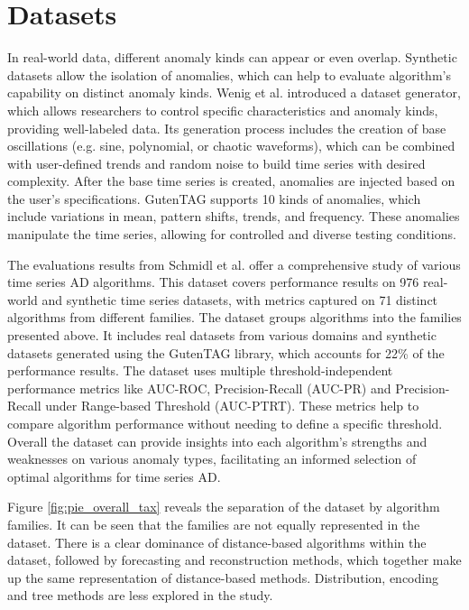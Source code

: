 \section{Datasets}
In real-world data, different anomaly kinds can appear or even overlap. Synthetic datasets allow the isolation of anomalies, which can help to evaluate algorithm’s capability on distinct anomaly kinds. Wenig et al. \cite{Wenig2022} introduced a dataset generator, which allows researchers to control specific characteristics and anomaly kinds, providing well-labeled data. Its generation process includes the creation of base oscillations (e.g. sine, polynomial, or chaotic waveforms), which can be combined with user-defined trends and random noise to build time series with desired complexity. After the base time series is created, anomalies are injected based on the user's specifications. GutenTAG supports 10 kinds of anomalies, which include variations in mean, pattern shifts, trends, and frequency. These anomalies manipulate the time series, allowing for controlled and diverse testing conditions.

The evaluations results from Schmidl et al. \cite{Schmidl2022} offer a comprehensive study of various time series AD algorithms. This dataset covers performance results on 976 real-world and synthetic time series datasets, with metrics captured on 71 distinct algorithms from different families. The dataset groups algorithms into the families presented above. It includes real datasets from various domains and synthetic datasets generated using the GutenTAG library, which accounts for 22\% of the performance results.
The dataset uses multiple threshold-independent performance metrics like AUC-ROC, Precision-Recall (AUC-PR) and Precision-Recall under Range-based Threshold (AUC-PTRT). These metrics help to compare algorithm performance without needing to define a specific threshold.
Overall the dataset can provide insights into each algorithm's strengths and weaknesses on various anomaly types, facilitating an informed selection of optimal algorithms for time series AD.



Figure \ref{fig:pie_overall_tax} reveals the separation of the dataset by algorithm families. It can be seen that the families are not equally represented in the dataset. There is a clear dominance of distance-based algorithms within the dataset, followed by forecasting and reconstruction methods, which together make up the same representation of distance-based methods. Distribution, encoding and tree methods are less explored in the study.

